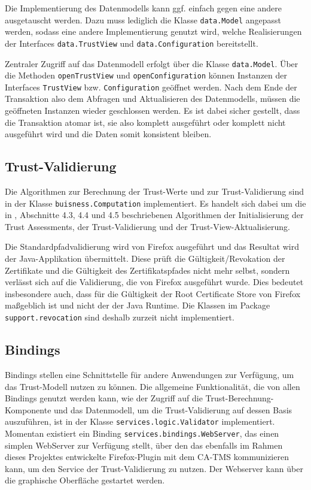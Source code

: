 \documentclass[accentcolor=tud1c,article,colorback,11pt]{tudreport}
\begin{document}
Die Implementierung des Datenmodells kann ggf. einfach gegen eine andere ausgetauscht werden. Dazu muss lediglich die Klasse \texttt{data.Model} angepasst werden, sodass eine andere Implementierung genutzt wird, welche Realisierungen der Interfaces \texttt{data.TrustView} und \texttt{data.Configuration} bereitstellt.

Zentraler Zugriff auf das Datenmodell erfolgt über die Klasse \texttt{data.Model}. Über die Methoden \texttt{openTrustView} und \texttt{openConfiguration} können Instanzen der Interfaces \texttt{TrustView} bzw. \texttt{Configuration} geöffnet werden. Nach dem Ende der Transaktion also dem Abfragen und Aktualisieren des Datenmodells, müssen die geöffneten Instanzen wieder geschlossen werden. Es ist dabei sicher gestellt, dass die Transaktion atomar ist, sie also komplett ausgeführt oder komplett nicht ausgeführt wird und die Daten somit konsistent bleiben.

\subsection{Trust-Validierung}

Die Algorithmen zur Berechnung der Trust-Werte und zur Trust-Validierung sind in der Klasse \texttt{buisness.Computation} implementiert. Es handelt sich dabei um die in \cite{braun2013trust}, Abschnitte 4.3, 4.4 und 4.5 beschriebenen Algorithmen der Initialisierung der Trust Assessments, der Trust-Validierung und der Trust-View-Aktualisierung.

Die Standardpfadvalidierung wird von Firefox ausgeführt und das Resultat wird der Java-Applikation übermittelt. Diese prüft die Gültigkeit/Revokation der Zertifikate und die Gültigkeit des Zertifikatspfades nicht mehr selbst, sondern verlässt sich auf die Validierung, die von Firefox ausgeführt wurde. Dies bedeutet insbesondere auch, dass für die Gültigkeit der Root Certificate Store von Firefox maßgeblich ist und nicht der der Java Runtime. Die Klassen im Package \texttt{support.revocation} sind deshalb zurzeit nicht implementiert.

\subsection{Bindings}
Bindings stellen eine Schnittstelle für andere Anwendungen zur Verfügung, um das Trust-Modell nutzen zu können. Die allgemeine Funktionalität, die von allen Bindings genutzt werden kann, wie der Zugriff auf die Trust-Berechnung-Komponente und das Datenmodell, um die Trust-Validierung auf dessen Basis auszuführen, ist in der Klasse \texttt{services.logic.Validator} implementiert. Momentan existiert ein Binding \texttt{services.bindings.WebServer}, das einen simplen WebServer zur Verfügung stellt, über den das ebenfalls im Rahmen dieses Projektes entwickelte Firefox-Plugin mit dem CA-TMS kommunizieren kann, um den Service der Trust-Validierung zu nutzen. Der Webserver kann über die graphische Oberfläche gestartet werden.
\end{document}
